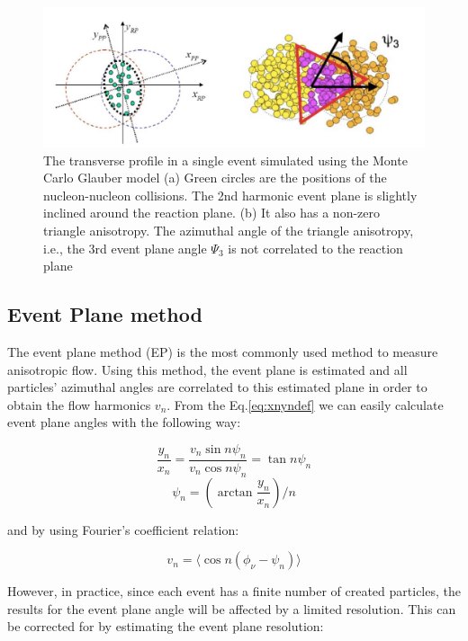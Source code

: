 \begin{figure}[h]
\centerline{\includegraphics[width=13.0cm]{figures/fig_complxshape}}
\caption{The transverse profile in a single event simulated using the Monte Carlo Glauber model \cite{Miller:2007ri, Bzdak:2006qk} (a) Green circles are the positions of the nucleon-nucleon collisions. The 2nd harmonic event plane is slightly inclined around the reaction plane. (b) It also has a non-zero triangle anisotropy. The azimuthal angle of the triangle anisotropy, i.e., the 3rd event plane angle $\Psi_3$ is not correlated to the reaction plane}
\label{fig:complexshape}
\end{figure}



\subsection{Event Plane method}

The event plane method (EP) is the most commonly used method to measure anisotropic flow. Using this method, the event plane is estimated and all particles' azimuthal angles are correlated to this estimated plane in order to obtain the flow harmonics $v_n$. From the Eq.\ref{eq:xnyndef} we can easily calculate event plane angles with the following way:


\begin{equation}
\frac{y_n}{x_n}=\frac{v_n\sin{n\psi_n}}{v_n\cos{n\psi_n}}=\tan{n\psi_n}
\end{equation}
\begin{equation}
\psi_n=(\arctan{\frac{y_n}{x_n}})/n
\end{equation}


and by using Fourier's coefficient relation:

\begin{equation}
v_n=\langle\cos{n(\phi_\nu - \psi_n)}\rangle 
\label{vndef}
\end{equation}
\smallskip


However, in practice, since each event has a finite number of created particles, the results for the event plane angle will be affected by a limited resolution. This can be corrected for by estimating the event plane resolution:

